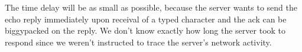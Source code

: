 \iffalse
In 5.B.pcap packet nr. 586, we see that the full contents of a `paste' are sent within \textbf{1} telnet packet.
\fi

The time delay will be as small as possible, because the server wants to send the echo reply immediately upon receival of a typed character and the ack can be biggypacked on the reply. We don't know exactly how long the server took to respond since we weren't instructed to trace the server's network activity.